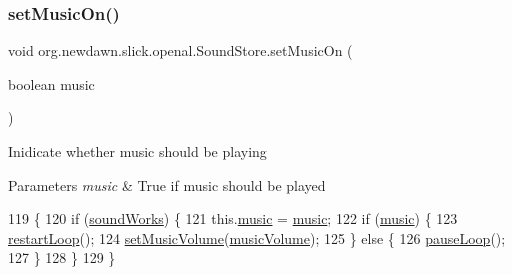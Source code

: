 \subsubsection{\texorpdfstring{set\+Music\+On()}{setMusicOn()}}
{\footnotesize\ttfamily void org.\+newdawn.\+slick.\+openal.\+Sound\+Store.\+set\+Music\+On (\begin{DoxyParamCaption}\item[{boolean}]{music }\end{DoxyParamCaption})\hspace{0.3cm}{\ttfamily [inline]}}

Inidicate whether music should be playing


\begin{DoxyParams}{Parameters}
{\em music} & True if music should be played \\
\hline
\end{DoxyParams}

\begin{DoxyCode}
119                                           \{
120         \textcolor{keywordflow}{if} (\mbox{\hyperlink{classorg_1_1newdawn_1_1slick_1_1openal_1_1_sound_store_ae563e9c1a01e333dc2350f1450f451fd}{soundWorks}}) \{
121             this.\mbox{\hyperlink{classorg_1_1newdawn_1_1slick_1_1openal_1_1_sound_store_a7e15ee371935f6d530e4481ac9e2bd7e}{music}} = \mbox{\hyperlink{classorg_1_1newdawn_1_1slick_1_1openal_1_1_sound_store_a7e15ee371935f6d530e4481ac9e2bd7e}{music}};
122             \textcolor{keywordflow}{if} (\mbox{\hyperlink{classorg_1_1newdawn_1_1slick_1_1openal_1_1_sound_store_a7e15ee371935f6d530e4481ac9e2bd7e}{music}}) \{
123                 \mbox{\hyperlink{classorg_1_1newdawn_1_1slick_1_1openal_1_1_sound_store_a7db8559efbd080f1c7eed7ce34415a54}{restartLoop}}();
124                 \mbox{\hyperlink{classorg_1_1newdawn_1_1slick_1_1openal_1_1_sound_store_a004456c4757e412245ae6f1dbb0319d1}{setMusicVolume}}(\mbox{\hyperlink{classorg_1_1newdawn_1_1slick_1_1openal_1_1_sound_store_a1394ddfb866b8bc402414b8f861227c0}{musicVolume}});
125             \} \textcolor{keywordflow}{else} \{
126                 \mbox{\hyperlink{classorg_1_1newdawn_1_1slick_1_1openal_1_1_sound_store_af8650bad0ed902a74410a079a5df9098}{pauseLoop}}();
127             \}
128         \}
129     \}
\end{DoxyCode}
\mbox{\label{classorg_1_1newdawn_1_1slick_1_1openal_1_1_sound_store_aaae95ffb59ac30b247edff6476450a1d}} 
